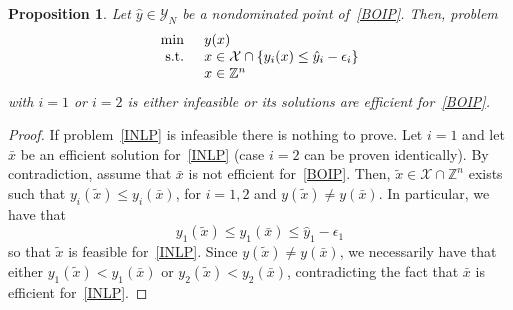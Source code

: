\documentclass[preprint,12pt]{elsarticle}
\newtheorem{proposition}[theorem]{Proposition}
\def\Z{\mathbb{Z}}
\begin{document}
\begin{proposition}\label{prop:nondom}
 Let $\hat y\in \mathcal{Y}_N$ be a nondominated point of~\eqref{BOIP}.
 Then, problem
\begin{equation}\label{INLP}
\begin{array}{l l}
    \min & y(x)\\
    \textnormal{ s.t. }& x\in \mathcal{X}\cap \{ y_i(x)\leq \hat y_i - \epsilon_i\}\\
    & x\in\Z^n
  \end{array}
 \end{equation}
 with $i=1$ or $i= 2$ is either infeasible or its solutions are efficient for~\eqref{BOIP}.
 \end{proposition}
\begin{proof}
If problem~\eqref{INLP} is infeasible there is nothing to prove.
Let $i=1$ and let $\bar x$ be an efficient solution for~\eqref{INLP}
(case $i=2$ can be proven identically).
By contradiction, assume that $\bar x$ is not efficient for~\eqref{BOIP}.
Then, $\tilde x\in \mathcal{X} \cap \Z^n$ exists
such that  $y_i(\tilde x)\leq y_i(\bar x)$, for $i=1,2$  and  $y(\tilde x)\neq y(\bar x)$.
In particular, we have that
\[y_1(\tilde x)\leq  y_1(\bar x) \leq  \hat y_1 - \epsilon_1\]
so that $\tilde x$ is feasible for~\eqref{INLP}.
Since $y(\tilde x)\neq y(\bar x)$, we necessarily have that either $y_1(\tilde x)< y_1(\bar x)$ or $y_2(\tilde x)< y_2(\bar x)$,
contradicting the fact that $\bar x$ is efficient for~\eqref{INLP}.
\end{proof}
\end{document}
